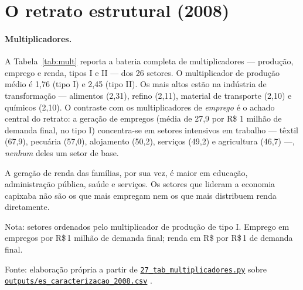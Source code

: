 \documentclass[11pt,a4paper]{article}
\begin{document}
\section{O retrato estrutural (2008)}
\label{sec:retrato}
\paragraph{Multiplicadores.}
A Tabela~\ref{tab:mult} reporta a bateria completa de multiplicadores --- produção,
emprego e renda, tipos I e II --- dos 26 setores. O multiplicador de produção médio é
1,76 (tipo I) e 2,45 (tipo II). Os mais altos estão na indústria de transformação ---
alimentos (2,31), refino (2,11), material de transporte (2,10) e químicos (2,10). O
contraste com os multiplicadores de \emph{emprego} é o achado central do retrato: a
geração de empregos (média de 27,9 por R\$ 1 milhão de demanda final, no tipo I) concentra-se
em setores intensivos em trabalho --- têxtil (67,9), pecuária (57,0), alojamento (50,2),
serviços (49,2) e agricultura (46,7) ---, \emph{nenhum} deles um setor de base.

A geração de renda das famílias, por sua vez, é maior em educação, administração
pública, saúde e serviços. Os setores que lideram a economia capixaba não são os que mais
empregam nem os que mais distribuem renda diretamente.

\begin{table}[tbp]
\caption{Multiplicadores de produção, emprego e renda dos 26 setores do ES, tipos I e II
(2008)}
\label{tab:mult}
\centering\footnotesize
\begin{threeparttable}

\begin{tablenotes}[flushleft]\footnotesize
\item Nota: setores ordenados pelo multiplicador de produção de tipo I. Emprego em empregos
por R\$\,1 milhão de demanda final; renda em R\$ por R\$\,1 de demanda final.
\item Fonte: elaboração própria a partir de
\href{https://github.com/fcarva/es-insumo-produto/blob/116a350/pesquisa/27_tab_multiplicadores.py}{\texttt{27\_tab\_multiplicadores.py}}
sobre
\href{https://github.com/fcarva/es-insumo-produto/blob/116a350/pesquisa/outputs/es_caracterizacao_2008.csv}{\texttt{outputs/es\_caracterizacao\_2008.csv}}
\citep{carvalho2026repo}.
\end{tablenotes}
\end{threeparttable}
\end{table}
\end{document}
